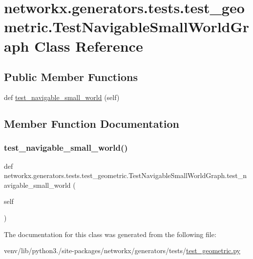 \hypertarget{classnetworkx_1_1generators_1_1tests_1_1test__geometric_1_1TestNavigableSmallWorldGraph}{}\section{networkx.\+generators.\+tests.\+test\+\_\+geometric.\+Test\+Navigable\+Small\+World\+Graph Class Reference}
\label{classnetworkx_1_1generators_1_1tests_1_1test__geometric_1_1TestNavigableSmallWorldGraph}
\subsection*{Public Member Functions}
\begin{DoxyCompactItemize}
\item 
def \hyperlink{classnetworkx_1_1generators_1_1tests_1_1test__geometric_1_1TestNavigableSmallWorldGraph_acfbe2a30c71dfc03e139071e7e3027ce}{test\+\_\+navigable\+\_\+small\+\_\+world} (self)
\end{DoxyCompactItemize}


\subsection{Member Function Documentation}
\mbox{\label{classnetworkx_1_1generators_1_1tests_1_1test__geometric_1_1TestNavigableSmallWorldGraph_acfbe2a30c71dfc03e139071e7e3027ce}} 
\subsubsection{\texorpdfstring{test\+\_\+navigable\+\_\+small\+\_\+world()}{test\_navigable\_small\_world()}}
{\footnotesize\ttfamily def networkx.\+generators.\+tests.\+test\+\_\+geometric.\+Test\+Navigable\+Small\+World\+Graph.\+test\+\_\+navigable\+\_\+small\+\_\+world (\begin{DoxyParamCaption}\item[{}]{self }\end{DoxyParamCaption})}



The documentation for this class was generated from the following file\+:\begin{DoxyCompactItemize}
\item 
venv/lib/python3./site-\/packages/networkx/generators/tests/\hyperlink{test__geometric_8py}{test\+\_\+geometric.\+py}\end{DoxyCompactItemize}
